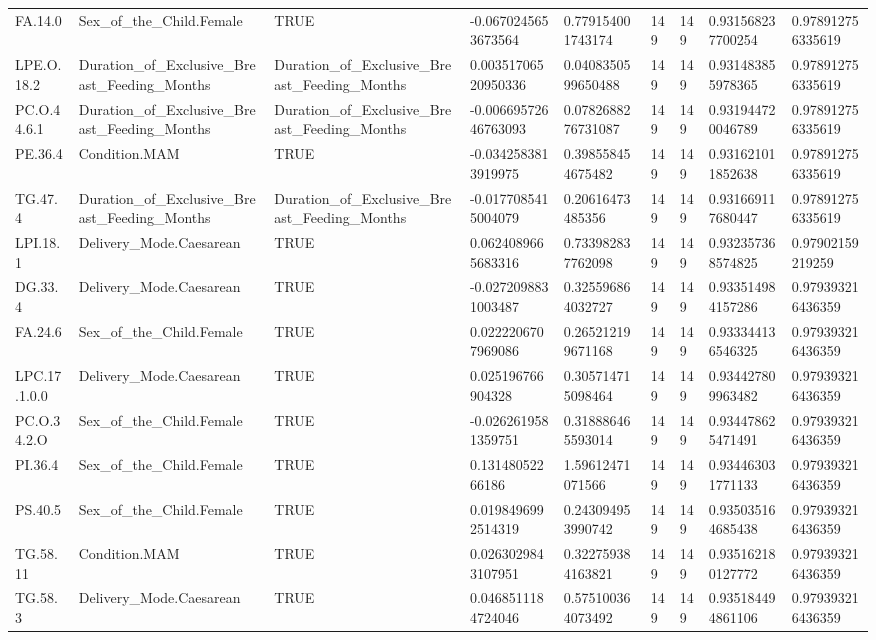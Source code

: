 \begin{longtable}{lllllllll}
FA.14.0 & Sex\_of\_the\_Child.Female & TRUE & -0.0670245653673564 & 0.779154001743174 & 149 & 149 & 0.931568237700254 & 0.978912756335619 \\
LPE.O.18.2 & Duration\_of\_Exclusive\_Breast\_Feeding\_Months & Duration\_of\_Exclusive\_Breast\_Feeding\_Months & 0.00351706520950336 & 0.0408350599650488 & 149 & 149 & 0.931483855978365 & 0.978912756335619 \\
PC.O.44.6.1 & Duration\_of\_Exclusive\_Breast\_Feeding\_Months & Duration\_of\_Exclusive\_Breast\_Feeding\_Months & -0.00669572646763093 & 0.0782688276731087 & 149 & 149 & 0.931944720046789 & 0.978912756335619 \\
PE.36.4 & Condition.MAM & TRUE & -0.0342583813919975 & 0.398558454675482 & 149 & 149 & 0.931621011852638 & 0.978912756335619 \\
TG.47.4 & Duration\_of\_Exclusive\_Breast\_Feeding\_Months & Duration\_of\_Exclusive\_Breast\_Feeding\_Months & -0.0177085415004079 & 0.20616473485356 & 149 & 149 & 0.931669117680447 & 0.978912756335619 \\
LPI.18.1 & Delivery\_Mode.Caesarean & TRUE & 0.0624089665683316 & 0.733982837762098 & 149 & 149 & 0.932357368574825 & 0.97902159219259 \\
DG.33.4 & Delivery\_Mode.Caesarean & TRUE & -0.0272098831003487 & 0.325596864032727 & 149 & 149 & 0.933514984157286 & 0.979393216436359 \\
FA.24.6 & Sex\_of\_the\_Child.Female & TRUE & 0.0222206707969086 & 0.265212199671168 & 149 & 149 & 0.933344136546325 & 0.979393216436359 \\
LPC.17.1.0.0 & Delivery\_Mode.Caesarean & TRUE & 0.025196766904328 & 0.305714715098464 & 149 & 149 & 0.934427809963482 & 0.979393216436359 \\
PC.O.34.2.O & Sex\_of\_the\_Child.Female & TRUE & -0.0262619581359751 & 0.318886465593014 & 149 & 149 & 0.934478625471491 & 0.979393216436359 \\
PI.36.4 & Sex\_of\_the\_Child.Female & TRUE & 0.13148052266186 & 1.59612471071566 & 149 & 149 & 0.934463031771133 & 0.979393216436359 \\
PS.40.5 & Sex\_of\_the\_Child.Female & TRUE & 0.0198496992514319 & 0.243094953990742 & 149 & 149 & 0.935035164685438 & 0.979393216436359 \\
TG.58.11 & Condition.MAM & TRUE & 0.0263029843107951 & 0.322759384163821 & 149 & 149 & 0.935162180127772 & 0.979393216436359 \\
TG.58.3 & Delivery\_Mode.Caesarean & TRUE & 0.0468511184724046 & 0.575100364073492 & 149 & 149 & 0.935184494861106 & 0.979393216436359 \\

\end{longtable}
